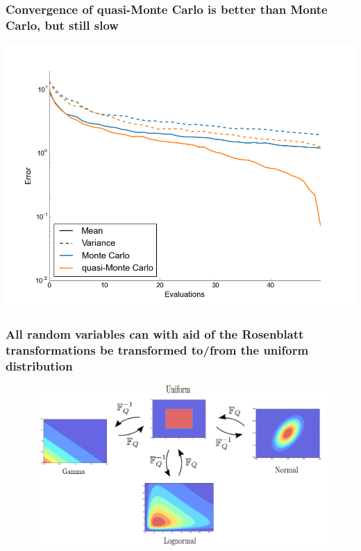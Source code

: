 \documentclass[handout]{beamer}
\newcommand{\E}[1]{\mbox{E}\!\left(#1\right)}
\newcommand{\Var}[1]{\mbox{Var}\!\left(#1\right)}
\begin{document}
\begin{frame}
  \frametitle{Convergence of quasi-Monte Carlo is better than Monte Carlo, but still slow}
  \begin{center}
    \includegraphics[width=1\textwidth]{qMC-MC_convergence_2D.png}
  \end{center}
\end{frame}



 \begin{frame}
 \frametitle{All random variables can with aid of the Rosenblatt transformations be transformed to/from the uniform distribution}
 \begin{figure}
 \includegraphics[width = \textwidth]{distributions.png}
 \end{figure}

 \end{frame}
\end{document}
